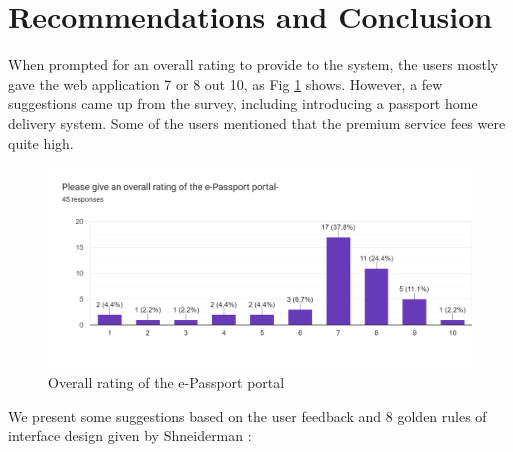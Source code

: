 \section{Recommendations and Conclusion}
\label{sec:discussion}

When prompted for an overall rating to provide to the system, the users mostly gave the web application 7 or 8 out 10, as Fig \ref{fig:overall} shows. However, a few suggestions came up from the survey, including introducing a passport home delivery system. Some of the users mentioned that the premium service fees were quite high.

\begin{figure}[ht]
\centering
\centerline{\includegraphics[width=\linewidth]{Figures/overall.png}}
\vspace{-10pt}\caption{Overall rating of the e-Passport portal}
\label{fig:overall}
\end{figure}

We present some suggestions based on the user feedback and 8 golden rules of interface design given by Shneiderman \cite{sp10}:

